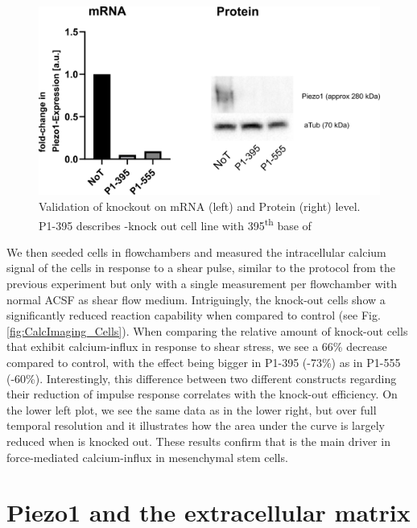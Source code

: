 \begin{figure}
	\centering
	\includegraphics[width=\linewidth]{Piezo1KO_Verification_WBandPCR.png}
	\caption{Validation of knockout on mRNA (left) and Protein (right) level. P1-395 describes \Piezo{}-knock out cell line with 395\textsuperscript{th} base of  }
	\label{fig:KO-Verification}
\end{figure}

We then seeded cells in flowchambers and measured the intracellular calcium signal of the cells in response to a shear pulse, similar to the protocol from the previous experiment but only with a single measurement per flowchamber with normal ACSF as shear flow medium. Intriguingly, the knock-out cells show a significantly reduced reaction capability when compared to control (see Fig. \ref{fig:CalcImaging_Cells}). When comparing the relative amount of knock-out cells that exhibit calcium-influx in response to shear stress, we see a 66\% decrease compared to control, with the effect being bigger in P1-395 (-73\%) as in P1-555 (-60\%). Interestingly, this difference between two different constructs regarding their reduction of impulse response correlates with the knock-out efficiency. On the lower left plot, we see the same data as in the lower right, but over full temporal resolution and it illustrates how the area under the curve is largely reduced when \Piezo{} is knocked out. 
These results confirm that \Piezo{} is the main driver in force-mediated calcium-influx in mesenchymal stem cells.


\section{Piezo1 and the extracellular matrix}
\label{sec:PiezoandECM}


